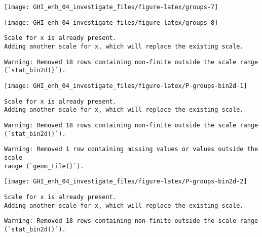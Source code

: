 \documentclass[
  10pt,
  a4paper,oneside]{article}
\begin{document}
\begin{center}\texttt{[image: GHI\_enh\_04\_investigate\_files/figure-latex/groups-7]} \end{center}

\begin{center}\texttt{[image: GHI\_enh\_04\_investigate\_files/figure-latex/groups-8]} \end{center}

\begin{verbatim}
Scale for x is already present.
Adding another scale for x, which will replace the existing scale.
\end{verbatim}

\begin{verbatim}
Warning: Removed 18 rows containing non-finite outside the scale range
(`stat_bin2d()`).
\end{verbatim}

\begin{center}\texttt{[image: GHI\_enh\_04\_investigate\_files/figure-latex/P-groups-bin2d-1]} \end{center}

\begin{verbatim}
Scale for x is already present.
Adding another scale for x, which will replace the existing scale.
\end{verbatim}

\begin{verbatim}
Warning: Removed 18 rows containing non-finite outside the scale range
(`stat_bin2d()`).
\end{verbatim}

\begin{verbatim}
Warning: Removed 1 row containing missing values or values outside the scale
range (`geom_tile()`).
\end{verbatim}

\begin{center}\texttt{[image: GHI\_enh\_04\_investigate\_files/figure-latex/P-groups-bin2d-2]} \end{center}

\begin{verbatim}
Scale for x is already present.
Adding another scale for x, which will replace the existing scale.
\end{verbatim}

\begin{verbatim}
Warning: Removed 18 rows containing non-finite outside the scale range
(`stat_bin2d()`).
\end{verbatim}
\end{document}
